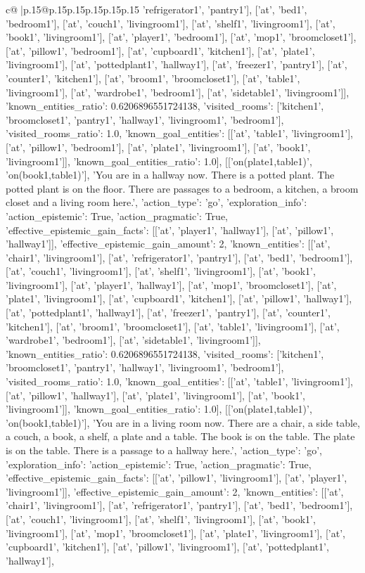 \documentclass{article}
\begin{document}
{\begin{supertabular}{c@{$\;$}|p{.15\linewidth}@{}p{.15\linewidth}p{.15\linewidth}p{.15\linewidth}p{.15\linewidth}p{.15\linewidth}}
{{{'refrigerator1', 'pantry1'], ['at', 'bed1', 'bedroom1'], ['at', 'couch1', 'livingroom1'], ['at', 'shelf1', 'livingroom1'], ['at', 'book1', 'livingroom1'], ['at', 'player1', 'bedroom1'], ['at', 'mop1', 'broomcloset1'], ['at', 'pillow1', 'bedroom1'], ['at', 'cupboard1', 'kitchen1'], ['at', 'plate1', 'livingroom1'], ['at', 'pottedplant1', 'hallway1'], ['at', 'freezer1', 'pantry1'], ['at', 'counter1', 'kitchen1'], ['at', 'broom1', 'broomcloset1'], ['at', 'table1', 'livingroom1'], ['at', 'wardrobe1', 'bedroom1'], ['at', 'sidetable1', 'livingroom1']], 'known_entities_ratio': 0.6206896551724138, 'visited_rooms': ['kitchen1', 'broomcloset1', 'pantry1', 'hallway1', 'livingroom1', 'bedroom1'], 'visited_rooms_ratio': 1.0, 'known_goal_entities': [['at', 'table1', 'livingroom1'], ['at', 'pillow1', 'bedroom1'], ['at', 'plate1', 'livingroom1'], ['at', 'book1', 'livingroom1']], 'known_goal_entities_ratio': 1.0}}], [['on(plate1,table1)', 'on(book1,table1)'], 'You are in a hallway now. There is a potted plant. The potted plant is on the floor. There are passages to a bedroom, a kitchen, a broom closet and a living room here.', {'action_type': 'go', 'exploration_info': {'action_epistemic': True, 'action_pragmatic': True, 'effective_epistemic_gain_facts': [['at', 'player1', 'hallway1'], ['at', 'pillow1', 'hallway1']], 'effective_epistemic_gain_amount': 2, 'known_entities': [['at', 'chair1', 'livingroom1'], ['at', 'refrigerator1', 'pantry1'], ['at', 'bed1', 'bedroom1'], ['at', 'couch1', 'livingroom1'], ['at', 'shelf1', 'livingroom1'], ['at', 'book1', 'livingroom1'], ['at', 'player1', 'hallway1'], ['at', 'mop1', 'broomcloset1'], ['at', 'plate1', 'livingroom1'], ['at', 'cupboard1', 'kitchen1'], ['at', 'pillow1', 'hallway1'], ['at', 'pottedplant1', 'hallway1'], ['at', 'freezer1', 'pantry1'], ['at', 'counter1', 'kitchen1'], ['at', 'broom1', 'broomcloset1'], ['at', 'table1', 'livingroom1'], ['at', 'wardrobe1', 'bedroom1'], ['at', 'sidetable1', 'livingroom1']], 'known_entities_ratio': 0.6206896551724138, 'visited_rooms': ['kitchen1', 'broomcloset1', 'pantry1', 'hallway1', 'livingroom1', 'bedroom1'], 'visited_rooms_ratio': 1.0, 'known_goal_entities': [['at', 'table1', 'livingroom1'], ['at', 'pillow1', 'hallway1'], ['at', 'plate1', 'livingroom1'], ['at', 'book1', 'livingroom1']], 'known_goal_entities_ratio': 1.0}}], [['on(plate1,table1)', 'on(book1,table1)'], 'You are in a living room now. There are a chair, a side table, a couch, a book, a shelf, a plate and a table. The book is on the table. The plate is on the table. There is a passage to a hallway here.', {'action_type': 'go', 'exploration_info': {'action_epistemic': True, 'action_pragmatic': True, 'effective_epistemic_gain_facts': [['at', 'pillow1', 'livingroom1'], ['at', 'player1', 'livingroom1']], 'effective_epistemic_gain_amount': 2, 'known_entities': [['at', 'chair1', 'livingroom1'], ['at', 'refrigerator1', 'pantry1'], ['at', 'bed1', 'bedroom1'], ['at', 'couch1', 'livingroom1'], ['at', 'shelf1', 'livingroom1'], ['at', 'book1', 'livingroom1'], ['at', 'mop1', 'broomcloset1'], ['at', 'plate1', 'livingroom1'], ['at', 'cupboard1', 'kitchen1'], ['at', 'pillow1', 'livingroom1'], ['at', 'pottedplant1', 'hallway1'], }}}
\end{supertabular}}
\end{document}
